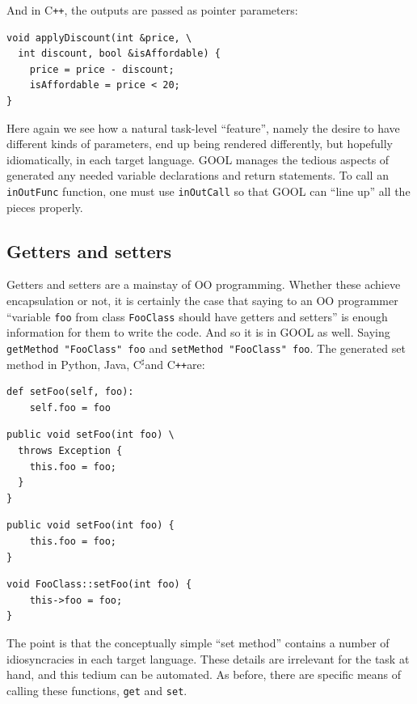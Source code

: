 \documentclass[sigplan,review,anonymous,prologue,dvipsnames]{acmart}
\newcommand{\Csharp}{C$^{\sharp}$}
\newcommand{\Cplusplus}{C\texttt{++}}
\begin{document}
And in \Cplusplus, the outputs are passed as pointer parameters:
\begin{lstlisting}
void applyDiscount(int &price, \
  int discount, bool &isAffordable) {
    price = price - discount;
    isAffordable = price < 20;
}
\end{lstlisting}
Here again we see how a natural task-level ``feature'', namely the
desire to have different kinds of parameters, end up being rendered differently,
but hopefully idiomatically, in each target language.  GOOL manages the
tedious aspects of generated any needed variable declarations and return
statements.  To call an \verb|inOutFunc| function, one must use
\verb|inOutCall| so that GOOL can ``line up'' all the pieces properly.

\subsection{Getters and setters}

Getters and setters are a mainstay of OO programming.  Whether these achieve
encapsulation or not, it is certainly the case that saying to an OO programmer
``variable \verb|foo| from class \verb|FooClass| should have getters and setters''
is enough information for them to write the code. And so it is in GOOL as well.
Saying \verb|getMethod "FooClass" foo| and \verb|setMethod "FooClass" foo|. 
The generated set method in Python, Java, \Csharp and \Cplusplus are:
\begin{lstlisting}
def setFoo(self, foo):
    self.foo = foo
\end{lstlisting}

\begin{lstlisting}
public void setFoo(int foo) \
  throws Exception {
    this.foo = foo;
  }
}
\end{lstlisting}

\begin{lstlisting}
public void setFoo(int foo) {
    this.foo = foo;
}
\end{lstlisting}

\begin{lstlisting}
void FooClass::setFoo(int foo) {
    this->foo = foo;
}
\end{lstlisting}
The point is that the conceptually simple ``set method'' contains a number
of idiosyncracies in each target language. These details are irrelevant for
the task at hand, and this tedium can be automated. As before, there are
specific means of calling these functions, \verb|get| and \verb|set|.
\end{document}

